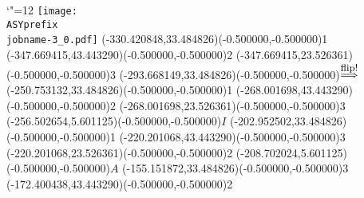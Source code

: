 \setlength{\unitlength}{1pt}
\makeatletter%
\let\ASYencoding\f@encoding%
\let\ASYfamily\f@family%
\let\ASYseries\f@series%
\let\ASYshape\f@shape%
\makeatother%
{\catcode`"=12%
\texttt{[image: \\ASYprefix\\jobname-3\_0.pdf]}%
}%
\color{ASYcolor}
\fontsize{12.000000}{14.400000}\selectfont
\usefont{\ASYencoding}{\ASYfamily}{\ASYseries}{\ASYshape}%
\ASYalign(-330.420848,33.484826)(-0.500000,-0.500000){1}%
\color{ASYcolor}
\fontsize{12.000000}{14.400000}\selectfont
\ASYalign(-347.669415,43.443290)(-0.500000,-0.500000){2}%
\color{ASYcolor}
\fontsize{12.000000}{14.400000}\selectfont
\ASYalign(-347.669415,23.526361)(-0.500000,-0.500000){3}%
\color{ASYcolor}
\fontsize{12.000000}{14.400000}\selectfont
\ASYalign(-293.668149,33.484826)(-0.500000,-0.500000){$\stackrel{\mbox{\small flip!}}{\Longrightarrow}$}%
\color{ASYcolor}
\fontsize{12.000000}{14.400000}\selectfont
\ASYalign(-250.753132,33.484826)(-0.500000,-0.500000){1}%
\color{ASYcolor}
\fontsize{12.000000}{14.400000}\selectfont
\ASYalign(-268.001698,43.443290)(-0.500000,-0.500000){2}%
\color{ASYcolor}
\fontsize{12.000000}{14.400000}\selectfont
\ASYalign(-268.001698,23.526361)(-0.500000,-0.500000){3}%
\color{ASYcolor}
\fontsize{12.000000}{14.400000}\selectfont
\ASYalign(-256.502654,5.601125)(-0.500000,-0.500000){$I$}%
\color{ASYcolor}
\fontsize{12.000000}{14.400000}\selectfont
\ASYalign(-202.952502,33.484826)(-0.500000,-0.500000){1}%
\color{ASYcolor}
\fontsize{12.000000}{14.400000}\selectfont
\ASYalign(-220.201068,43.443290)(-0.500000,-0.500000){3}%
\color{ASYcolor}
\fontsize{12.000000}{14.400000}\selectfont
\ASYalign(-220.201068,23.526361)(-0.500000,-0.500000){2}%
\color{ASYcolor}
\fontsize{12.000000}{14.400000}\selectfont
\ASYalign(-208.702024,5.601125)(-0.500000,-0.500000){$A$}%
\color{ASYcolor}
\fontsize{12.000000}{14.400000}\selectfont
\ASYalign(-155.151872,33.484826)(-0.500000,-0.500000){3}%
\color{ASYcolor}
\fontsize{12.000000}{14.400000}\selectfont
\ASYalign(-172.400438,43.443290)(-0.500000,-0.500000){2}%
\color{ASYcolor}
\fontsize{12.000000}{14.400000}\selectfont
